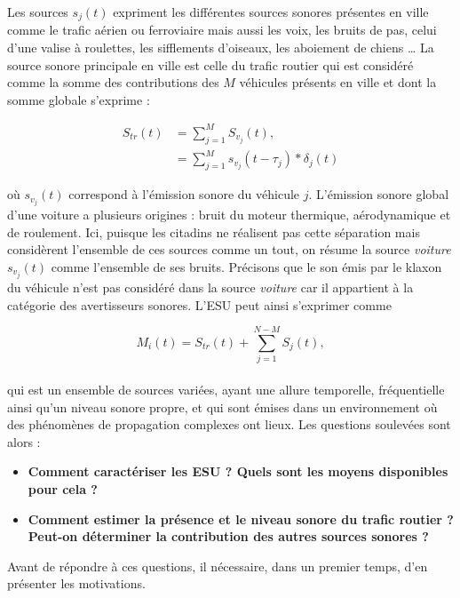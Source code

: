 Les sources $s_j(t)$ expriment les différentes sources sonores présentes en ville comme le trafic aérien ou ferroviaire mais aussi les voix, les bruits de pas, celui d'une valise à roulettes, les sifflements d'oiseaux, les aboiement de chiens \dots{} La source sonore principale en ville est celle du trafic routier qui est considéré comme la somme des contributions des $M$ véhicules présents en ville et dont la somme globale s'exprime :

\begin{subequations}
\begin{align}
S_{tr}(t) &= \sum_{j = 1}^M S_{v_j}(t),\\
 & = \sum_{j = 1}^M s_{v_j}(t-\tau_j) \ast \delta_{j}(t)
\end{align}
\end{subequations}

où $s_{v_j}(t)$ correspond à l'émission sonore du véhicule $j$. L'émission sonore global d'une voiture a plusieurs origines : bruit du moteur thermique, aérodynamique et de roulement. Ici, puisque les citadins ne réalisent pas cette séparation mais considèrent l'ensemble de ces sources comme un tout, on résume la source \textit{voiture} $s_{v_j}(t)$ comme l'ensemble de ses bruits. Précisons que le son émis par le klaxon du véhicule n'est pas considéré dans la source \textit{voiture} car il appartient à la catégorie des avertisseurs sonores.
L'ESU peut ainsi s'exprimer comme  

\begin{equation}
M_i(t) = S_{tr}(t)+\sum_{j = 1}^{N-M}S_j(t),
\end{equation}
\\

qui est un ensemble de sources variées, ayant une allure temporelle, fréquentielle ainsi qu'un niveau sonore propre, et qui sont émises dans un environnement où des phénomènes de propagation complexes ont lieux. Les questions soulevées sont alors : 
 
\begin{itemize}
\item \textbf{Comment caractériser les ESU ? Quels sont les moyens disponibles pour cela ?}
\item \textbf{Comment estimer la présence et le niveau sonore du trafic routier ? Peut-on déterminer la contribution des autres sources sonores ?}\\
\end{itemize}

Avant de répondre à ces questions, il nécessaire, dans un premier temps, d'en présenter les motivations.

